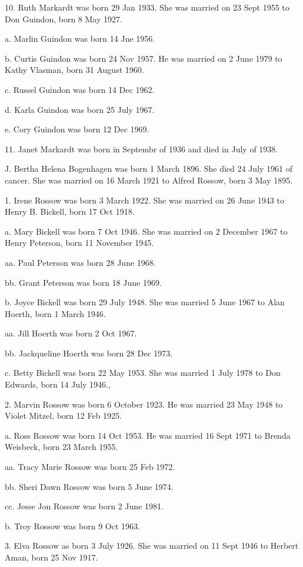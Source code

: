\documentclass[a4paper]{article}
\begin{document}
10. Ruth Markardt was born 29 Jan 1933.  She was married on 23 Sept 1955 to Don Guindon, born 8 May 1927.
 
a. Marlin Guindon was born 14 Jne 1956.

b. Curtis Guindon was born 24 Nov 1957.  He was married on 2 June 1979 to Kathy Vlasman, born 31 August 1960.
 
c. Russel Guindon was born 14 Dec 1962.

d. Karla Guindon was born 25 July 1967.

e. Cory Guindon was born 12 Dec 1969.

11. Janet Markardt was born in Septembr of 1936 and died in July of 1938.

J. Bertha Helena Bogenhagen was born 1 March 1896.  She died 24 July 1961 of cancer. She was married on 16 March 1921 to Alfred Rossow, born 3 May 1895.
 
1. Irene Rossow was born 3 March 1922.  She was married on 26 June 1943 to Henry B. Bickell, born 17 Oct 1918.
 
a. Mary Bickell was born 7 Oct 1946.  She was married on 2 December 1967 to Henry Peterson, born 11 November 1945.
 
aa. Paul Peterson was born 28 June 1968.

bb. Grant Peterson was born 18 June 1969.

b. Joyce Bickell was born 29 July 1948.  She was married 5 June 1967 to Alan Hoerth, born 1 March 1946.
 
aa. Jill Hoerth was born 2 Oct 1967.

bb. Jackqueline Hoerth was born 28 Dec 1973.

c. Betty Bickell was born 22 May 1953.  She was married 1 July 1978 to Don Edwards, born 14 July 1946.,
 
2. Marvin Rossow was born 6 October 1923.  He was married 23 May 1948 to Violet Mitzel, born 12 Feb 1925.
 
a. Ross Rossow was born 14 Oct 1953.  He was married 16 Sept 1971 to Brenda Weisbeck, born 23 March 1955.
 
aa. Tracy Marie Rossow was born 25 Feb 1972.
 
bb. Sheri Dawn Rossow was born 5 June 1974.

cc. Jesse Jon Rossow was born 2 June 1981.

b. Troy Rossow was born 9 Oct 1963.

3. Elva Rossow as born 3 July 1926.  She was married on 11 Sept 1946 to Herbert Aman, born 25 Nov 1917.
 
\end{document}
